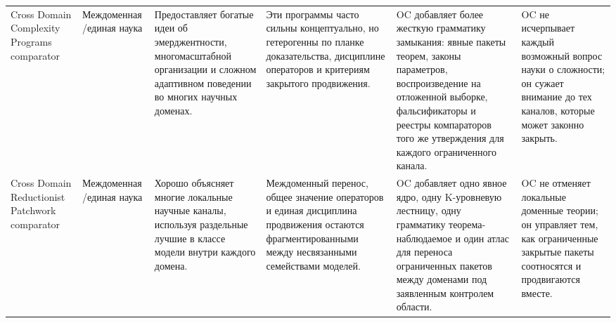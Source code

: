 \begin{longtable}{@{}L{0.17\textwidth}L{0.09\textwidth}L{0.17\textwidth}L{0.17\textwidth}L{0.20\textwidth}L{0.14\textwidth}@{}}
Cross Domain Complexity Programs comparator & Междоменная /\allowbreak единая наука & Предоставляет богатые идеи об эмерджентности, многомасштабной организации и сложном адаптивном поведении во многих научных доменах. & Эти программы часто сильны концептуально, но гетерогенны по планке доказательства, дисциплине операторов и критериям закрытого продвижения. & OC добавляет более жесткую грамматику замыкания: явные пакеты теорем, законы параметров, воспроизведение на отложенной выборке, фальсификаторы и реестры компараторов того же утверждения для каждого ограниченного канала. & OC не исчерпывает каждый возможный вопрос науки о сложности; он сужает внимание до тех каналов, которые может законно закрыть. \\
Cross Domain Reductionist Patchwork comparator & Междоменная /\allowbreak единая наука & Хорошо объясняет многие локальные научные каналы, используя раздельные лучшие в классе модели внутри каждого домена. & Междоменный перенос, общее значение операторов и единая дисциплина продвижения остаются фрагментированными между несвязанными семействами моделей. & OC добавляет одно явное ядро, одну K-уровневую лестницу, одну грамматику теорема-наблюдаемое и один атлас для переноса ограниченных пакетов между доменами под заявленным контролем области. & OC не отменяет локальные доменные теории; он управляет тем, как ограниченные закрытые пакеты соотносятся и продвигаются вместе. \\
\bottomrule
\end{longtable}
\endgroup

